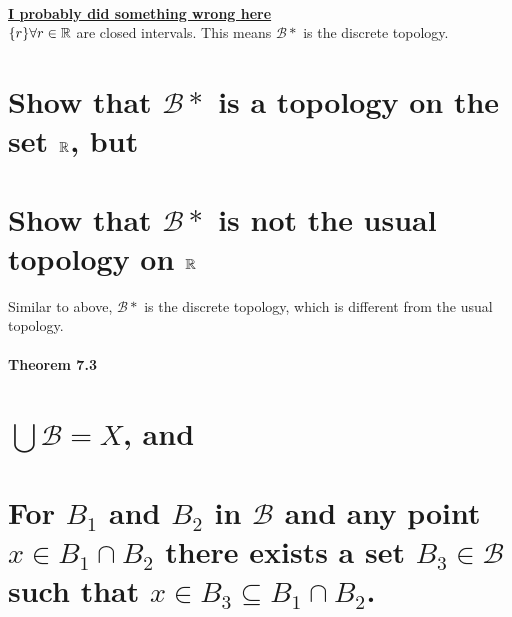 \begin{solution}
  \\\underline{\textbf{I probably did something wrong here}} \\
  $\{r\} \forall r \in \mathbb{R}$ are closed intervals. This means $\mathcal{B}*$ is the discrete topology.
\end{solution}


\begin{parts}
 \part{Show that $\mathcal{B}*$ is a topology on the set $\mathbb{R}$, but}
 \part{Show that $\mathcal{B}*$ is not the usual topology on $\mathbb{R}$}
\end{parts}

\begin{solution}
 Similar to above, $\mathcal{B}*$ is the discrete topology, which is different from the usual topology.
\end{solution}

\subsection{Theorem 7.3}
\setcounter{question}{0}


\begin{parts}
 \part{$\bigcup \mathcal{B} = X$, and}
 \part{For $B_1$ and $B_2$ in $\mathcal{B}$ and any point $x \in B_1 \cap B_2$ there exists a set $B_3 \in \mathcal{B}$ such that $x \in B_3 \subseteq B_1 \cap B_2$.}
\end{parts}

